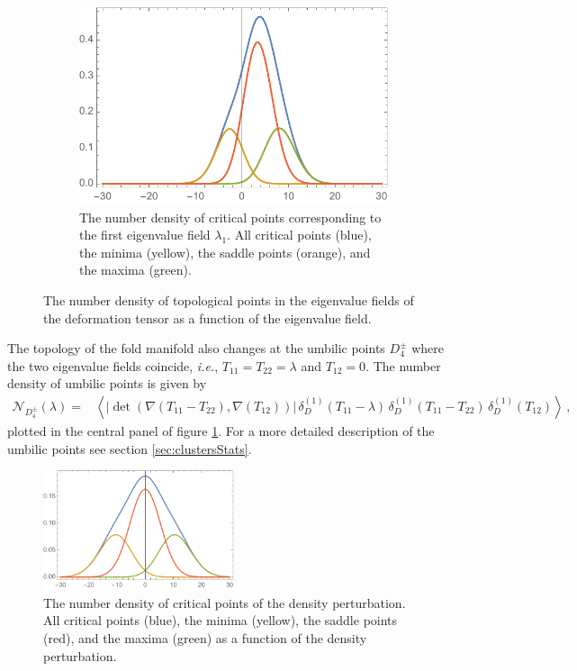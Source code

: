 \documentclass[a4paper, 11pt]{article}
\begin{document}
\begin{figure}
\begin{subfigure}[b]{0.32\textwidth}
\includegraphics[width=\textwidth]{Lambda1Density}
\caption{The number density of critical points corresponding to the first eigenvalue field $\lambda_1$. All critical points (blue), the minima (yellow), the saddle points (orange), and the maxima (green).\\}
\end{subfigure}
\caption{The number density of topological points in the eigenvalue fields of the deformation tensor as a function of the eigenvalue field.}
\label{fig:EigenvalueCriticalPoints}
\end{figure}

The topology of the fold manifold also changes at the umbilic points $D_4^\pm$ where the two eigenvalue fields coincide, \textit{i.e.}, $T_{11}=T_{22}=\lambda$ and $T_{12}=0$. The number density of umbilic points is given by
\begin{align}
\mathcal{N}_{D_4^\pm}(\lambda) =& 
\left \langle \left|\det\left(\nabla (T_{11}-T_{22}), \nabla (T_{12})\right)\right|\, 
\delta_D^{(1)}(T_{11} - \lambda)\, 
\delta_D^{(1)}(T_{11}-T_{22})\, 
\delta_D^{(1)}(T_{12}) \right \rangle\,,
\end{align}
plotted in the central panel of figure \ref{fig:EigenvalueCriticalPoints}. For a more detailed description of the umbilic points see section \ref{sec:clustersStats}.


\begin{figure}
\centering
\includegraphics[width=0.5\textwidth]{DensityDensity}
\caption{The number density of critical points of the density perturbation. All critical points (blue), the minima (yellow), the saddle points (red), and the maxima (green) as a function of the density perturbation. }
\label{fig:delta_critical}
\end{figure}
\end{document}
